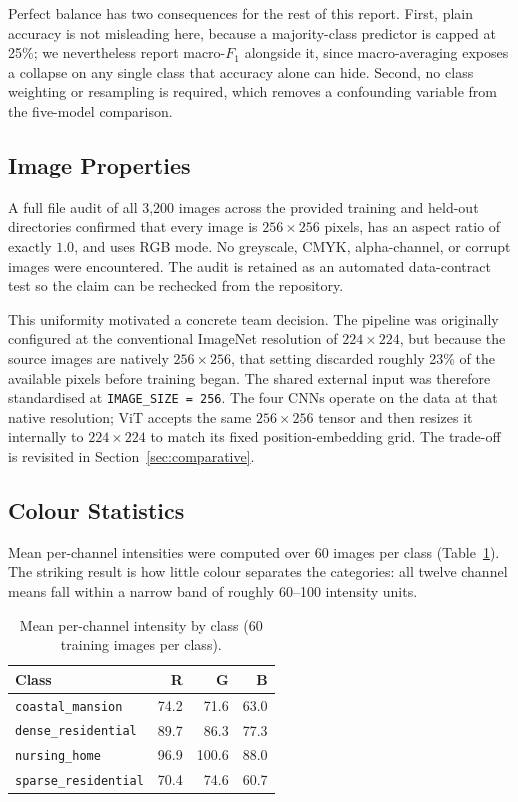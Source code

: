 \documentclass[11pt,twoside,a4paper]{article}
\begin{document}
Perfect balance has two consequences for the rest of this report. First, plain
accuracy is not misleading here, because a majority-class predictor is capped
at 25\%; we nevertheless report macro-$F_1$ alongside it, since macro-averaging
exposes a collapse on any single class that accuracy alone can hide. Second,
no class weighting or resampling is required, which removes a confounding
variable from the five-model comparison.

\subsection{Image Properties}

A full file audit of all 3{,}200 images across the provided training and
held-out directories confirmed that every image is $256 \times 256$ pixels,
has an aspect ratio of exactly $1.0$, and uses RGB mode. No greyscale, CMYK,
alpha-channel, or corrupt images were encountered. The audit is retained as an
automated data-contract test so the claim can be rechecked from the repository.

This uniformity motivated a concrete team decision. The pipeline was
originally configured at the conventional ImageNet resolution of
$224 \times 224$, but because the source images are natively $256 \times 256$,
that setting discarded roughly 23\% of the available pixels before training
began. The shared external input was therefore standardised at
\texttt{IMAGE\_SIZE = 256}. The four CNNs operate on the data at that native
resolution; ViT accepts the same $256 \times 256$ tensor and then resizes it
internally to $224 \times 224$ to match its fixed position-embedding grid. The
trade-off is revisited in Section~\ref{sec:comparative}.

\subsection{Colour Statistics}

Mean per-channel intensities were computed over 60 images per class
(Table~\ref{tab:colour-signature}). The striking result is how little colour
separates the categories: all twelve channel means fall within a narrow band
of roughly 60--100 intensity units.

\begin{table}[H]
\centering
\caption{Mean per-channel intensity by class (60 training images per class).}
\label{tab:colour-signature}
\small
\begin{tabular}{lrrr}
\toprule
Class & R & G & B \\
\midrule
\texttt{coastal\_mansion}    & 74.2 & 71.6 & 63.0 \\
\texttt{dense\_residential}  & 89.7 & 86.3 & 77.3 \\
\texttt{nursing\_home}       & 96.9 & 100.6 & 88.0 \\
\texttt{sparse\_residential} & 70.4 & 74.6 & 60.7 \\
\bottomrule
\end{tabular}
\end{table}
\end{document}
